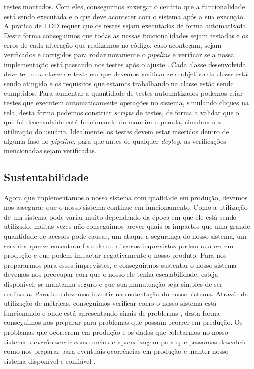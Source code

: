         testes montados. Com eles, conseguimos enxergar o cenário que a funcionalidade
        está sendo executada e o que deve acontecer com o sistema após a sua execução.
        \newline
        A prática de TDD requer que os testes sejam executados de forma automatizada.
        Desta forma conseguimos que todas as nossas funcionalidades sejam testadas
        e os erros de cada alteração que realizamos no código, caso aconteçam,
        sejam verificados e corrigidos para rodar novamente o \textit{pipeline}
        e verificar se a nossa implementação está passando nos testes após o ajuste
        \cite{ContinuousDelivery}. Cada classe desenvolvida deve ter uma classe
        de teste em que devemos verificar se o objetivo da classe está sendo atingido
        e os requisitos que estamos trabalhando na classe estão sendo cumpridos.
        Para aumentar a quantidade de testes automatizados podemos criar testes
        que executem automaticamente operações no sistema, simulando cliques na
        tela, desta forma podemos construir \textit{scripts} de testes, de forma
        a validar que o que foi desenvolvido está funcionando da maneira esperada,
        simulando a utilização do usuário. Idealmente, os testes devem estar inseridos
        dentro de alguma fase do \textit{pipeline}, para que antes de qualquer
        \textit{deploy}, as verificações mencionadas sejam verificadas. \newline

      \subsection{Sustentabilidade}
        Agora que implementamos o nosso sistema com qualidade em produção, devemos
        nos assegurar que o nosso sistema continue em funcionamento. Como a utilização
        de um sistema pode variar muito dependendo da época em que ele está sendo
        utilizado, muitas vezes não conseguimos prever quais os impactos que uma
        grande quantidade de acessos pode causar, um ataque a segurança do nosso
        sistema, um servidor que se encontrou fora do ar, diversos imprevistos podem
        ocorrer em produção e que podem impactar negativamente o nosso produto. \newline
        Para nos prepararmos para esses imprevistos, e conseguirmos sustentar o
        nosso sistema devemos nos preocupar com que o nosso ele tenha escalabilidade,
        esteja disponível, se mantenha seguro e que sua manutenção seja simples
        de ser realizada. Para isso devemos investir na sustentação do nosso sistema.
        Através da utilização de métricas, conseguimos verificar como o nosso sistema
        está funcionando e onde está apresentando sinais de problemas \cite{
        TheDevOpsHandbook}, desta forma conseguimos nos preparar para problemas
        que possam ocorrer em produção. Os problemas que ocorrerem em produção e
        os dados que coletarmos no nosso sistema, deverão servir como meio de
        aprendizagem para que possamos descobrir como nos preparar para eventuais
        ocorrências em produção e manter nosso sistema disponível e confiável \cite{
        SiteReliabilityEngineering}.

